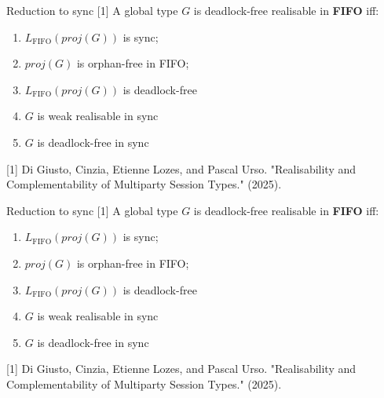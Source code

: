 \documentclass{beamer}
\begin{document}



\begin{frame}{Reduction to sync [1]}
	\vspace{1.5cm}
	A global type $G$ is deadlock-free realisable in \textbf{FIFO} iff:
	\begin{enumerate}
		\item $L_{\text{FIFO}}(proj(G))$ is sync;
		\item $proj(G)$ is orphan-free in FIFO; %
		\item $L_{\text{FIFO}}(proj(G))$ is deadlock-free
		\item $G$ is weak realisable in sync
		\item $G$ is deadlock-free in sync
	\end{enumerate}
	
	\vspace{1.5cm}

	\small{[1] Di Giusto, Cinzia, Etienne Lozes, and Pascal Urso. "Realisability and Complementability of Multiparty Session Types." (2025).}
\end{frame}

\begin{frame}{Reduction to sync [1]}
	\vspace{1.5cm}
	A global type $G$ is deadlock-free realisable in \textbf{FIFO} iff:
	\begin{enumerate}
		\item $L_{\text{FIFO}}(proj(G))$ is sync;
		\item $proj(G)$ is orphan-free in FIFO; %
		\item $L_{\text{FIFO}}(proj(G))$ is deadlock-free
		\item $G$ is weak realisable in sync \hspace{4mm} \scalebox{1.5}{{\color{red}$\longleftarrow$}}
		\item $G$ is deadlock-free in sync 
	\end{enumerate}
	
	\vspace{1.5cm}

	\small{[1] Di Giusto, Cinzia, Etienne Lozes, and Pascal Urso. "Realisability and Complementability of Multiparty Session Types." (2025).}
\end{frame}
\end{document}
